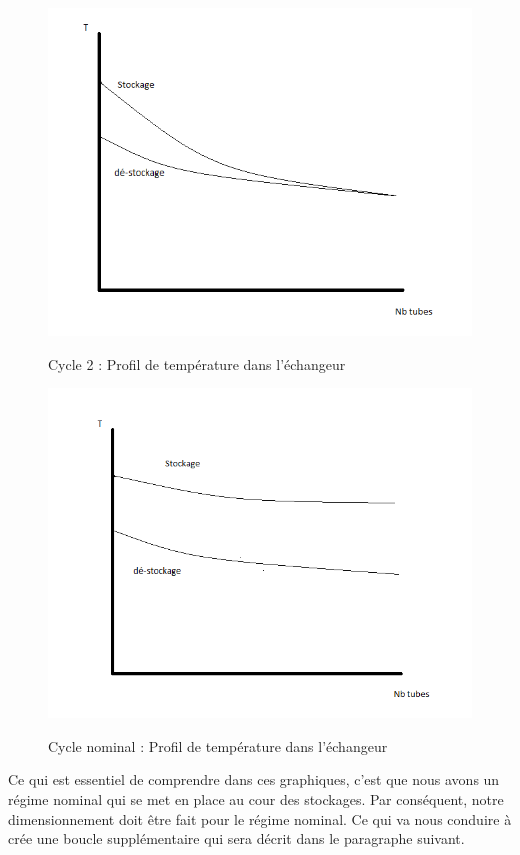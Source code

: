 \begin{figure}[!h]
	\centering
	\caption{Cycle 2 : Profil de température dans l'échangeur}
	\includegraphics[scale=0.4]{PHOTO/courbe2.png}
	\label{graph2}
\end{figure}

\begin{figure}[!h]
	\centering
	\caption{Cycle nominal : Profil de température dans l'échangeur}
	\includegraphics[scale=0.4]{PHOTO/courbe3.png}
	\label{graph3}
\end{figure}

\newpage

 Ce qui est essentiel de comprendre dans ces graphiques, c'est que nous avons un régime nominal qui se met en place au cour des stockages. Par conséquent, notre dimensionnement doit être fait pour le régime nominal. Ce qui va nous conduire à crée une boucle supplémentaire qui sera décrit dans le paragraphe suivant. 
\newpage

